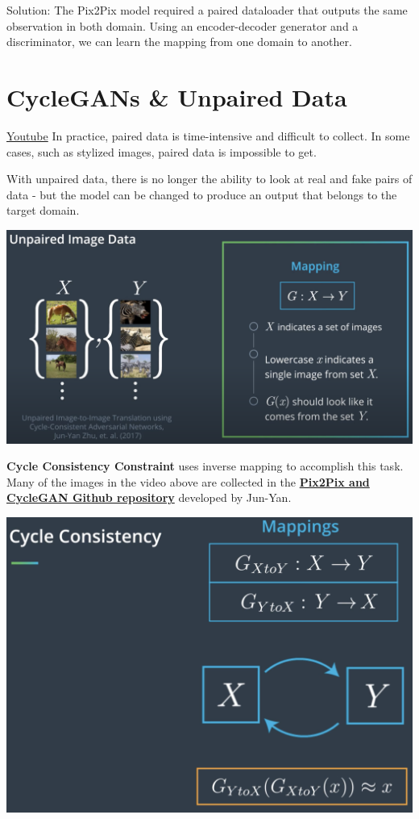 Solution: The Pix2Pix model required a paired dataloader that outputs the same observation in both domain. Using an encoder-decoder generator and a discriminator, we can learn the mapping from one domain to another.
\section{CycleGANs \& Unpaired Data}
\href{https://www.youtube.com/watch?v=-fbaRaXDqMY}{Youtube} \newline
In practice, paired data is time-intensive and difficult to collect. In some cases, such as stylized images, paired data is impossible to get.\newline

With unpaired data, there is no longer the ability to look at real and fake pairs of data - but the model can be changed to produce an output that belongs to the target domain.

\includegraphics[width=1\linewidth]{img//genAdvNet//image2image/unpairedGAN.png}

\textbf{Cycle Consistency Constraint} uses inverse mapping to accomplish this task.
Many of the images in the video above are collected in the \href{https://github.com/junyanz/pytorch-CycleGAN-and-pix2pix}{\textbf{Pix2Pix and CycleGAN Github repository}} developed by Jun-Yan.

\includegraphics[width=1\linewidth]{img//genAdvNet//image2image/cycleGAN.png}

